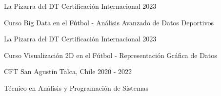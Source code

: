 \documentclass[]{awesome-cv}
\begin{document}
\vspace{4mm}
\begin{cventries}
	\vspace{-3mm}
	\cventry
	{}
	{La Pizarra del DT \vspace{-5mm}}
	{Certificación Internacional \vspace{-5mm}}
	{2023 \vspace{-5mm}}
	{\begin{cvsectionnormaltext} 
		\item{Curso Big Data en el Fútbol - Análisis Avanzado de Datos Deportivos}
	\end{cvsectionnormaltext}}

	\vspace{-3mm}
	\cventry
	{}
	{La Pizarra del DT \vspace{-5mm}}
	{Certificación Internacional \vspace{-5mm}}
	{2023 \vspace{-5mm}}
	{\begin{cvsectionnormaltext} 
		\item{Curso Visualización 2D en el Fútbol - Representación Gráfica de Datos}
	\end{cvsectionnormaltext}}

	\vspace{-3mm}
	\cventry
	{}
	{CFT San Agustín \vspace{-5mm}}
	{Talca, Chile \vspace{-5mm}}
	{2020 - 2022 \vspace{-5mm}}
	{\begin{cvsectionnormaltext} 
		\item{Técnico en Análisis y Programación de Sistemas}
	\end{cvsectionnormaltext}}
\end{cventries}
\end{document}
